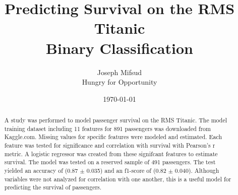 \documentclass[10pt]{article}
\title{Predicting Survival on the RMS Titanic\\
	\large{Binary Classification}}
\author{	Joseph Mifsud  \\
		Hungry for Opportunity}
\date{\today}
\begin{document}
\maketitle
\begin{abstract}

	A study was performed to model passenger survival on the RMS Titanic.
	The model training dataset including 11 features for 891 passengers was downloaded from Kaggle.com.
	Missing values for specific features were modeled and estimated.
	Each feature was tested for significance and correlation with survival with Pearson's r metric.
	A logistic regressor was created from these signifcant features to estimate survival.
	The model was tested on a reserved sample of 491 passengers.
	The test yielded an accuracy of (0.87 $\pm$ 0.035) and an f1-score of (0.82 $\pm$ 0.040).
	Although variables were not analyzed for correlation with one another, this is a useful model for predicting the survival of passengers.

\end{abstract}
\end{document}
